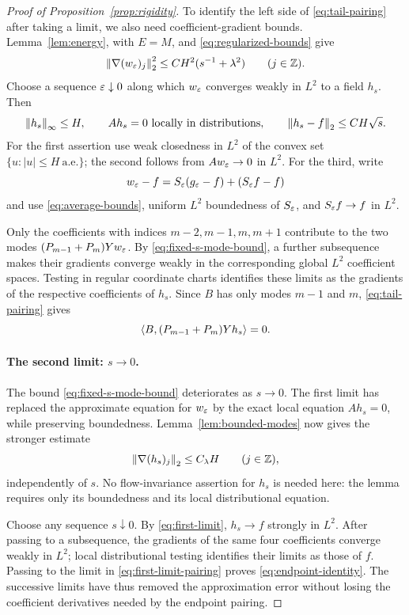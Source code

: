 \begin{proof}[Proof of Proposition~\ref{prop:rigidity}]
To identify the left side of \eqref{eq:tail-pairing} after taking a
limit, we also need coefficient-gradient bounds.  Lemma~\ref{lem:energy},
with $E=M$, and \eqref{eq:regularized-bounds} give
\begin{equation}\label{eq:fixed-s-mode-bound}
 \left\lVert\nabla(w_\varepsilon)_j\right\rVert_2^2
 \le CH^2(s^{-1}+\lambda^2)
 \qquad(j\in\mathbb Z).
\end{equation}
Choose a sequence $\varepsilon\downarrow0$ along which $w_\varepsilon$ converges weakly
in $L^2$ to a field $h_s$.  Then
\begin{equation}\label{eq:first-limit}
 \left\lVert h_s\right\rVert_\infty\le H,
 \qquad Ah_s=0\text{ locally in distributions},
 \qquad \left\lVert h_s-f\right\rVert_2\le CH\sqrt{s}.
\end{equation}
For the first assertion use weak closedness in $L^2$ of the convex set
$\{u:|u|\le H\ \text{a.e.}\}$; the second follows from
$Aw_\varepsilon\to0$ in $L^2$.  For the third, write
\[
 w_\varepsilon-f=S_\varepsilon(g_\varepsilon-f)+(S_\varepsilon f-f)
\]
and use \eqref{eq:average-bounds}, uniform $L^2$ boundedness of
$S_\varepsilon$, and $S_\varepsilon f\to f$ in $L^2$.

Only the coefficients with indices $m-2,m-1,m,m+1$ contribute to the
two modes $(P_{m-1}+P_m)Yw_\varepsilon$.  By
\eqref{eq:fixed-s-mode-bound}, a further subsequence makes their
gradients converge weakly in the corresponding global $L^2$ coefficient
spaces.  Testing in regular coordinate charts identifies these limits
as the gradients of the respective coefficients of $h_s$.
Since $B$ has only modes $m-1$ and $m$, \eqref{eq:tail-pairing} gives
\begin{equation}\label{eq:first-limit-pairing}
 \left\langle B,(P_{m-1}+P_m)Yh_s\right\rangle=0.
\end{equation}

\paragraph{The second limit: $s\to0$.}
The bound \eqref{eq:fixed-s-mode-bound} deteriorates as $s\to0$.
The first limit has replaced the approximate equation for $w_\varepsilon$
by the exact local equation $Ah_s=0$, while preserving boundedness.
Lemma~\ref{lem:bounded-modes} now gives the stronger estimate
\[
 \left\lVert\nabla(h_s)_j\right\rVert_2\le C_\lambda H
 \qquad(j\in\mathbb Z),
\]
independently of $s$.  No flow-invariance assertion for $h_s$ is needed
here: the lemma requires only its boundedness and its local
distributional equation.

Choose any sequence $s\downarrow0$.  By \eqref{eq:first-limit},
$h_s\to f$ strongly in $L^2$.  After passing to a subsequence, the
gradients of the same four coefficients converge weakly in $L^2$;
local distributional testing identifies their limits as those of $f$.
Passing to the limit in \eqref{eq:first-limit-pairing} proves
\eqref{eq:endpoint-identity}.  The successive limits have thus removed
the approximation error without losing the coefficient derivatives
needed by the endpoint pairing.


\end{proof}
